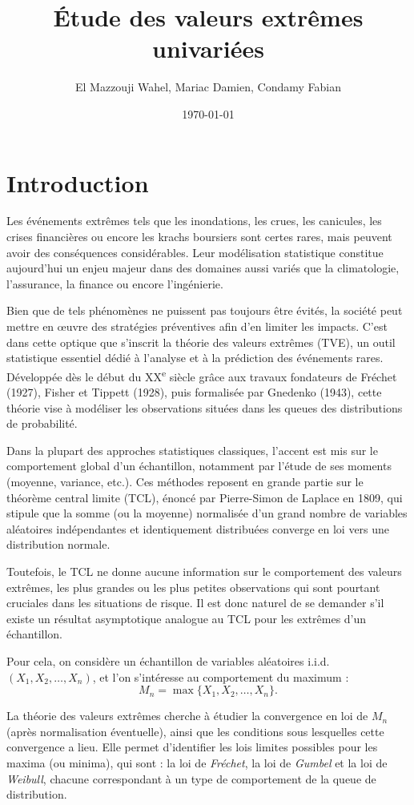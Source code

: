 \documentclass{article}
\title{Étude des valeurs extrêmes univariées}
\author{El Mazzouji Wahel, Mariac Damien, Condamy Fabian}
\date{\today}
\begin{document}
\maketitle 
\newpage
\tableofcontents 
\newpage
\section{Introduction}

Les événements extrêmes tels que les inondations, les crues, les canicules, les crises financières ou encore les krachs boursiers sont certes rares, mais peuvent avoir des conséquences considérables. Leur modélisation statistique constitue aujourd’hui un enjeu majeur dans des domaines aussi variés que la climatologie, l’assurance, la finance ou encore l’ingénierie.

Bien que de tels phénomènes ne puissent pas toujours être évités, la société peut mettre en œuvre des stratégies préventives afin d’en limiter les impacts. C’est dans cette optique que s’inscrit la théorie des valeurs extrêmes (TVE), un outil statistique essentiel dédié à l’analyse et à la prédiction des événements rares. Développée dès le début du XX\textsuperscript{e} siècle grâce aux travaux fondateurs de Fréchet (1927), Fisher et Tippett (1928), puis formalisée par Gnedenko (1943), cette théorie vise à modéliser les observations situées dans les queues des distributions de probabilité.

Dans la plupart des approches statistiques classiques, l’accent est mis sur le comportement global d’un échantillon, notamment par l’étude de ses moments (moyenne, variance, etc.). Ces méthodes reposent en grande partie sur le théorème central limite (TCL), énoncé par Pierre-Simon de Laplace en 1809, qui stipule que la somme (ou la moyenne) normalisée d’un grand nombre de variables aléatoires indépendantes et identiquement distribuées converge en loi vers une distribution normale.

Toutefois, le TCL ne donne aucune information sur le comportement des valeurs extrêmes, les plus grandes ou les plus petites observations qui sont pourtant cruciales dans les situations de risque. Il est donc naturel de se demander s’il existe un résultat asymptotique analogue au TCL pour les extrêmes d’un échantillon.

Pour cela, on considère un échantillon de variables aléatoires i.i.d. $(X_1, X_2, \dots, X_n)$, et l’on s’intéresse au comportement du maximum :
\[
M_n = \max\{X_1, X_2, \dots, X_n\}.
\]

La théorie des valeurs extrêmes cherche à étudier la convergence en loi de $M_n$ (après normalisation éventuelle), ainsi que les conditions sous lesquelles cette convergence a lieu. Elle permet d’identifier les lois limites possibles pour les maxima (ou minima), qui sont : la loi de \textit{Fréchet}, la loi de \textit{Gumbel} et la loi de \textit{Weibull}, chacune correspondant à un type de comportement de la queue de distribution.
\end{document}
